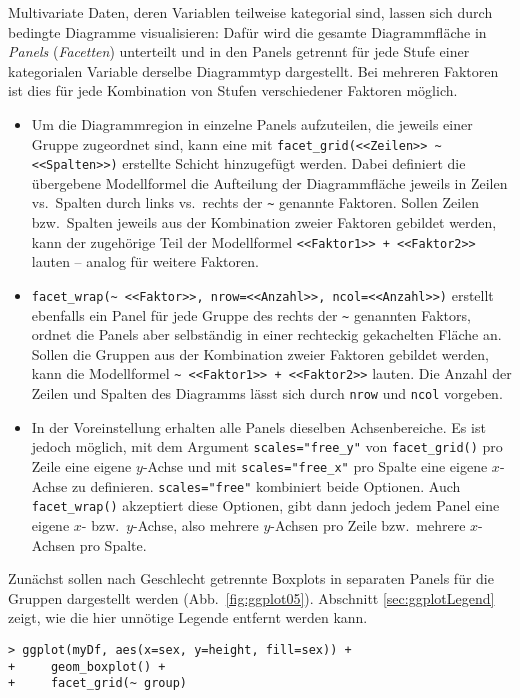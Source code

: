 
Multivariate Daten, deren Variablen teilweise kategorial sind, lassen sich durch bedingte Diagramme visualisieren: Dafür wird die gesamte Diagrammfläche in \emph{Panels} (\emph{Facetten}) unterteilt und in den Panels getrennt für jede Stufe einer kategorialen Variable derselbe Diagrammtyp dargestellt. Bei mehreren Faktoren ist dies für jede Kombination von Stufen verschiedener Faktoren möglich.

\begin{itemize}
\item Um die Diagrammregion in einzelne Panels aufzuteilen, die jeweils einer Gruppe zugeordnet sind, kann eine mit  \lstinline!facet_grid(<<Zeilen>> ~ <<Spalten>>)! erstellte Schicht hinzugefügt werden. Dabei definiert die übergebene Modellformel die Aufteilung der Diagrammfläche jeweils in Zeilen vs.\ Spalten durch links vs.\ rechts der \lstinline!~! genannte Faktoren. Sollen Zeilen bzw.\ Spalten jeweils aus der Kombination zweier Faktoren gebildet werden, kann der zugehörige Teil der Modellformel \lstinline!<<Faktor1>> + <<Faktor2>>! lauten -- analog für weitere Faktoren. 
\item {} \lstinline!facet_wrap(~ <<Faktor>>, nrow=<<Anzahl>>, ncol=<<Anzahl>>)! erstellt ebenfalls ein Panel für jede Gruppe des rechts der \lstinline!~! genannten Faktors, ordnet die Panels aber selbständig in einer rechteckig gekachelten Fläche an. Sollen die Gruppen aus der Kombination zweier Faktoren gebildet werden, kann die Modellformel \lstinline!~ <<Faktor1>> + <<Faktor2>>! lauten. Die Anzahl der Zeilen und Spalten des Diagramms lässt sich durch \lstinline!nrow! und \lstinline!ncol! vorgeben.
\item In der Voreinstellung erhalten alle Panels dieselben Achsenbereiche. Es ist jedoch möglich, mit dem Argument \lstinline!scales="free_y"! von \lstinline!facet_grid()! pro Zeile eine eigene $y$-Achse und mit \lstinline!scales="free_x"! pro Spalte eine eigene $x$-Achse zu definieren. \lstinline!scales="free"! kombiniert beide Optionen. Auch \lstinline!facet_wrap()! akzeptiert diese Optionen, gibt dann jedoch jedem Panel eine eigene $x$- bzw.\ $y$-Achse, also mehrere $y$-Achsen pro Zeile bzw.\ mehrere $x$-Achsen pro Spalte.
\end{itemize}

Zunächst sollen nach Geschlecht getrennte Boxplots in separaten Panels für die Gruppen dargestellt werden (Abb.\ \ref{fig:ggplot05}). Abschnitt \ref{sec:ggplotLegend} zeigt, wie die hier unnötige Legende entfernt werden kann.
\begin{lstlisting}
> ggplot(myDf, aes(x=sex, y=height, fill=sex)) +
+     geom_boxplot() +
+     facet_grid(~ group)
\end{lstlisting}

